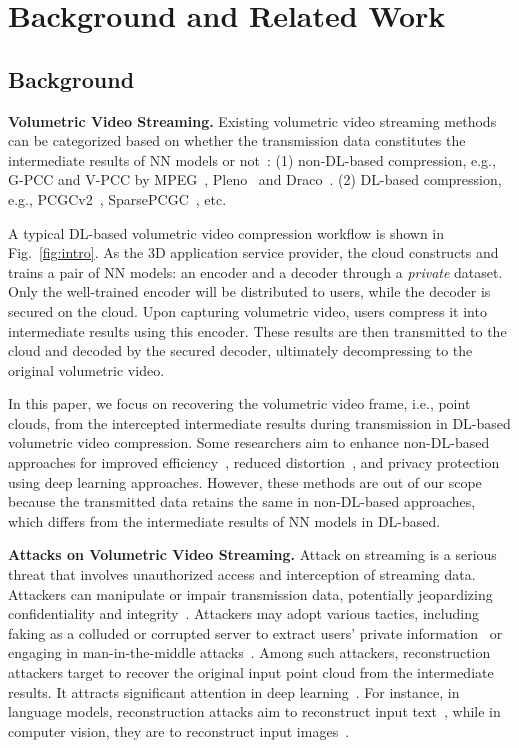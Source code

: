 \section{Background and Related Work}
\subsection{Background}
\textbf{Volumetric Video Streaming.}
Existing volumetric video streaming methods can be categorized based on whether the transmission data constitutes the intermediate results of NN models or not~\cite{gao2022openpointcloud}:
(1) non-DL-based compression, e.g., G-PCC and V-PCC by MPEG~\cite{mpegpcc}, Pleno~\cite{jpeg}
and Draco~\cite{draco}.
(2) DL-based compression, e.g., PCGCv2~\cite{pcgcv2}, SparsePCGC~\cite{spcgc}, etc.

A typical DL-based volumetric video compression workflow is shown in Fig.~\ref{fig:intro}. As the 3D application service provider, the cloud constructs and trains a pair of NN models: an encoder and a decoder through a \textit{private} dataset. Only the well-trained encoder will be distributed to users, while the decoder is secured on the cloud. Upon capturing volumetric video, users compress it into intermediate results using this encoder. These results are then transmitted to the cloud and decoded by the secured decoder, ultimately decompressing to the original volumetric video. 

In this paper, we focus on recovering the volumetric video frame, i.e., point clouds, from the intercepted intermediate results during transmission in DL-based volumetric video compression.
Some researchers aim to enhance non-DL-based approaches for improved efficiency~\cite{akhtar2020point}, reduced distortion~\cite{zhang2023gpccpp}, and privacy protection~\cite{lu2023pagoda} using deep learning approaches. However, these methods are out of our scope because the transmitted data retains the same in non-DL-based approaches, which differs from the intermediate results of NN models in DL-based.

\noindent\textbf{Attacks on Volumetric Video Streaming.}
Attack on streaming is a serious threat that involves unauthorized access and interception of streaming data. Attackers can manipulate or impair transmission data, potentially jeopardizing confidentiality and integrity~\cite{ni2020security}.
Attackers may adopt various tactics, including faking as a colluded or corrupted server to extract users' private information~\cite{ren2023hcnct} or engaging in man-in-the-middle attacks~\cite{vladimirov2022security}. 
Among such attackers, reconstruction attackers target to recover the original input point cloud from the intermediate results. It attracts significant attention in deep learning~\cite{jegorova2022survey}. For instance, in language models, reconstruction attacks aim to reconstruct input text~\cite{brown2022does}, while in computer vision, they are to reconstruct input images~\cite{lu2022preva}. 

